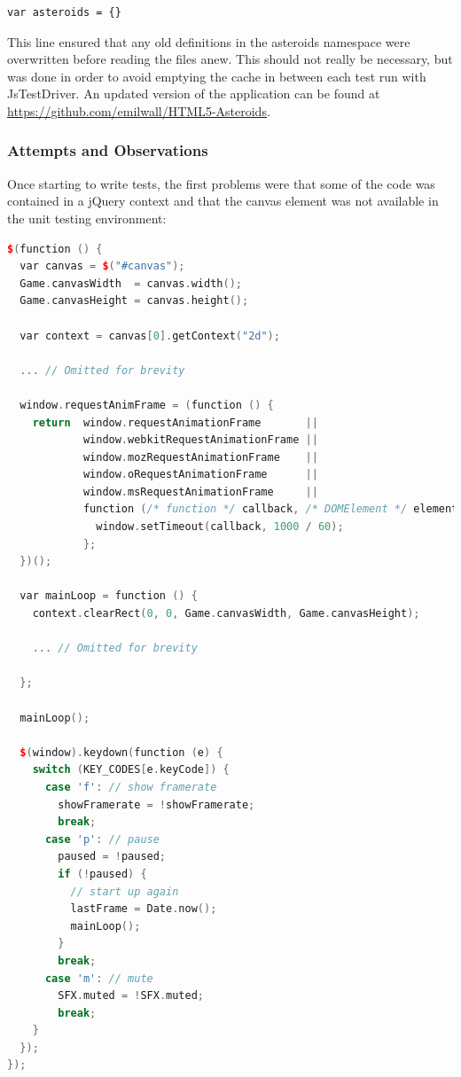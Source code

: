 \documentclass[11pt]{article}
\begin{document}
\begin{verbatim}
var asteroids = {}
\end{verbatim}

This line ensured that any old definitions in the asteroids namespace were overwritten before reading the files anew. This should not really be necessary, but was done in order to avoid emptying the cache in between each test run with JsTestDriver. An updated version of the application can be found at \url{https://github.com/emilwall/HTML5-Asteroids}.

\subsubsection{Attempts and Observations}
\label{ssubsec:attemptsandobservations}

Once starting to write tests, the first problems were that some of the code was contained in a jQuery context and that the canvas element was not available in the unit testing environment:

\begin{lstlisting}[language=C++, keywords={function, var, new, if, else, switch, case, break, return, for}]
$(function () {
  var canvas = $("#canvas");
  Game.canvasWidth  = canvas.width();
  Game.canvasHeight = canvas.height();

  var context = canvas[0].getContext("2d");

  ... // Omitted for brevity

  window.requestAnimFrame = (function () {
    return  window.requestAnimationFrame       ||
            window.webkitRequestAnimationFrame ||
            window.mozRequestAnimationFrame    ||
            window.oRequestAnimationFrame      ||
            window.msRequestAnimationFrame     ||
            function (/* function */ callback, /* DOMElement */ element) {
              window.setTimeout(callback, 1000 / 60);
            };
  })();

  var mainLoop = function () {
    context.clearRect(0, 0, Game.canvasWidth, Game.canvasHeight);

    ... // Omitted for brevity

  };

  mainLoop();

  $(window).keydown(function (e) {
    switch (KEY_CODES[e.keyCode]) {
      case 'f': // show framerate
        showFramerate = !showFramerate;
        break;
      case 'p': // pause
        paused = !paused;
        if (!paused) {
          // start up again
          lastFrame = Date.now();
          mainLoop();
        }
        break;
      case 'm': // mute
        SFX.muted = !SFX.muted;
        break;
    }
  });
});
\end{lstlisting}
\end{document}
